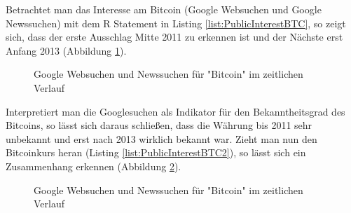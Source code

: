 Betrachtet man das Interesse am Bitcoin (Google Websuchen und Google Newssuchen) mit dem R Statement in Listing \ref{list:PublicInterestBTC}, so zeigt sich, dass der erste Ausschlag Mitte 2011 zu erkennen ist und der Nächste erst Anfang 2013 (Abbildung \ref{fig:PublicInterestBTC}). 

\begin{figure}[H]
\centering
{}
\caption{Google Websuchen und Newssuchen für "Bitcoin" im zeitlichen Verlauf}
\label{fig:PublicInterestBTC}
\end{figure}
Interpretiert man die Googlesuchen als Indikator für den Bekanntheitsgrad des Bitcoins, so lässt sich daraus schließen, dass die Währung bis 2011 sehr unbekannt und erst nach 2013 wirklich bekannt war. Zieht man nun den Bitcoinkurs heran (Listing \ref{list:PublicInterestBTC2}), so lässt sich ein Zusammenhang erkennen (Abbildung \ref{fig:PublicInterestBTC2}). 

\begin{figure}[H]
\centering
{}
\caption{Google Websuchen und Newssuchen für "Bitcoin" im zeitlichen Verlauf}
\label{fig:PublicInterestBTC2}
\end{figure}
